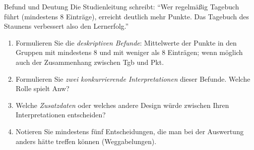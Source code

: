 \begin{uebungsblatt}{Befund und Deutung}
Die Studienleitung schreibt: \enquote{Wer regelmäßig Tagebuch führt
(mindestens 8 Einträge), erreicht deutlich mehr Punkte. Das Tagebuch des
Staunens verbessert also den Lernerfolg.}
\begin{enumerate}
  \item[(a)] Formulieren Sie die \emph{deskriptiven Befunde}: Mittelwerte
    der Punkte in den Gruppen mit mindestens 8 und mit weniger als 8
    Einträgen; wenn möglich auch der Zusammenhang zwischen Tgb und Pkt.
  \item[(b)] Formulieren Sie \emph{zwei konkurrierende Interpretationen}
    dieser Befunde. Welche Rolle spielt Anw?
  \item[(c)] Welche \emph{Zusatzdaten} oder welches andere Design würde
    zwischen Ihren Interpretationen entscheiden?
  \item[(d)] Notieren Sie mindestens fünf Entscheidungen, die man bei der
    Auswertung anders hätte treffen können (Weggabelungen).
\end{enumerate}
\end{uebungsblatt}

